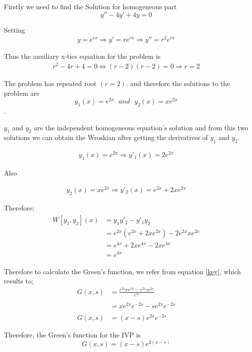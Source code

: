 \documentclass[12pt,a4paper]{article}
\begin{document}
\begin{enumerate}
\begin{enumerate}
Firstly we need to find the Solution for  homogeneous part $$y''-4y'+4y=0$$

Setting
\begin{align*}
y=e^{rx}\Longrightarrow y'=re^{rx}\Longrightarrow y''=r^2e^{rx}
\end{align*}

Thus the auxiliary x-tics equation for the problem is
\begin{align}
r^2 -4r+4=0 \Longleftrightarrow (r-2)(r-2)=0\Longrightarrow r=2
\end{align}

The problem has repeated root $(r=2)$. and therefore the solutions to the problem are $$y_1(x)=e^{2x} \,\,\,\,and\,\,\,\, y_2(x)=xe^{2x}$$.

$y_1$ and $y_2$ are the independent homogeneous equation's solution and from this two solutions we can obtain the Wroskian after getting the derivatives of $y_1$ and $y_2$.


\begin{align*}
y_1(x)=e^{2x}\Longrightarrow y'_1(x)=2e^{2x}
\end{align*}

Also

\begin{align*}
y_2(x)=xe^{2x}\Longrightarrow y'_2(x)=e^{2x}+2xe^{2x}
\end{align*}

Therefore;
\begin{align}
\begin{aligned}
W[y_1,y_2](x)&=y_1y'_2-y'_1y_2\\
&=e^{2x}(e^{2x}+2xe^{2x}) -2e^{2x}xe^{2x}\\
&=e^{4x}+2xe^{4x}-2xe^{4x}\\
&=e^{4x}
\end{aligned}
\end{align}

Therefore to calculate the Green's function, we refer from equation \ref{key}, which results to;
\begin{align*}
G(x,s) &= \frac{e^{2s}xe^{2x}-e^{2x}se^{2s}}{e^{4s}}\\\\
&=xe^{2x}e^{-2s}-se^{2x}e^{-2s}\\\\
G(x,s)&=(x-s)e^{2x}e^{-2s}
\end{align*}

Therefore, the Green's function  for the IVP is $$G(x,s)=(x-s)e^{2(x-s)}$$


\end{enumerate}
\end{enumerate}
\end{document}
